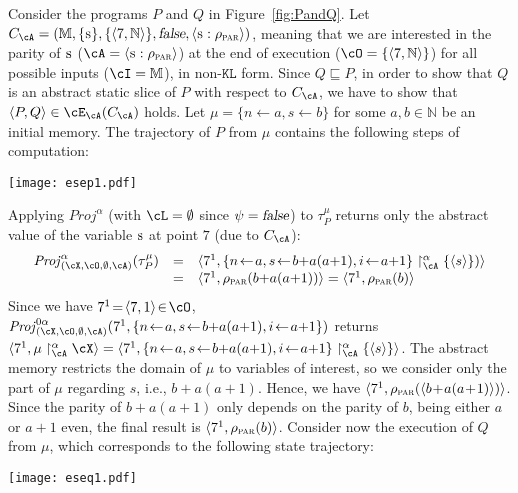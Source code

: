 \documentclass[prodmode,acmtocl]{acmsmall}
\newcommand{\caX}{\cX}
\def\prog{\ensuremath{P}\xspace}
\def\progq{\ensuremath{Q}\xspace}
\def\trace{\ensuremath{\tau}\xspace}
\def\memory{\ensuremath{\mu}\xspace}
\def\memories{\ensuremath{\mathbb{M}}\xspace}
\newcommand{\BIND}[2]{#1\!\leftarrow\!#2}
\def\crit{\ensuremath{C}\xspace}
\def\uco{\ensuremath{\rho}\xspace}
\def\KL{\ensuremath{\mathtt{KL}}\xspace}
\newcommand{\ABSMEM}[3]{#1 \upharpoonright^\alpha_{#3} #2}
\def\Proj{\ensuremath{\mathit{Proj}}\xspace}
\newcommand{\false}{\mbox{\sl false}}
\def\tuple#1{\langle #1 \rangle}
\newcommand{\0}{\mbox{\bf 0}}
\newcommand{\CODE}[1]{\ensuremath{\mbox{\lstinline!#1!}\xspace}\xspace}
\def\ss{\CODE{s}}
\def\NATURALS{\mathbb{N}}
\def\PARDOM{\ensuremath{\uco_{\textsc{par}}}\xspace}
\begin{document}
\begin{example}
  Consider the programs $\prog$ and $\progq$ in
  Figure~\ref{fig:PandQ}. Let $\crit_{\cA} = (\memories, \{\mbox{\ss}
  \},\{\tuple{7,\NATURALS}\}, \false,
  \tuple{\mbox{\ss}:\uco_{\textsc{par}}})$, meaning that we are
  interested in the parity of \ss
  ($\cA=\tuple{\mbox{\ss}:\uco_{\textsc{par}}}$) at the end of
  execution ($\cO=\{\tuple{7,\NATURALS}\}$) for all possible inputs
  ($\cI = \memories$), in non-$\KL$ form.  Since $\progq \sqsubseteq
  \prog$, in order to show that $\progq$ is an abstract static slice
  of $\prog$ with respect to $\crit_{\cA}$, we have to show that
  $\tuple{\prog,\progq} \in \cE_{\cA}(\crit_{\cA})$ holds.  Let
  $\memory = \{\BIND{n}{a}, \BIND{s}{b}\}$ for some $a,b\in\NATURALS$
  be an initial memory.  The trajectory of $\prog$ from $\memory$
  contains the following steps of computation:
\begin{center}
\texttt{[image: esep1.pdf]}
\end{center}
  Applying $\Proj^\alpha$ (with $\cL=\emptyset$ since $\psi=\false$)
  to $\trace_\prog^\memory$ returns only the abstract value of the
  variable \ss at point $7$ (due to $\crit_\cA$):
  \[
  \begin{array}{rcl}
    \Proj^\alpha_{(\caX,\cO,\emptyset,\cA)}(\trace_\prog^\memory) & =
    &
    \tuple{7^1, \ABSMEM{\{ \BIND{n}{a}, \BIND{s}{b{+}a(a{+}1)},
      \BIND{i}{a{+}1} \}}{\{\langle s \rangle\}}{\cA})} \\ & = & \tuple{7^1,
    \PARDOM(b{+}a(a{+}1))}  =  \tuple{7^1, \PARDOM(b)}
  \end{array}
  \]
  \noindent Since we have $7^1\!=\!\tuple{7, 1}\!\in\!\cO$,
  $\Proj^{0\alpha}_{(\caX,\cO,\emptyset,\cA)}(7^{1}, \{\BIND{n}{a},
  \BIND{s}{b{+}a(a{+}1)}, \BIND{i}{a{+}1} \})$ returns
  $\tuple{7^1,\ABSMEM{\memory}{\caX}{\cA}} = \tuple{7^1, \ABSMEM{\{
      \BIND{n}{a}, \BIND{s}{b{+}a(a{+}1)}, \BIND{i}{a{+}1}
      \}}{\{\langle s \rangle\}}{\cA}}$.  The abstract memory
  restricts the domain of $\memory$ to variables of interest, so we
  consider only the part of $\memory$ regarding $s$, i.e.,
  $b\!+\!a(a\!+\!1)$.  Hence, we have $\tuple{7^1, \PARDOM(\langle
    b\!+\!a(a\!+\!1)\rangle)}$.  Since the parity of $b{+}a(a{+}1)$
  only depends on the parity of $b$, being either $a$ or $a+1$ even,
  the final result is $\tuple{7^1, \PARDOM(b)}$.  Consider now the
  execution of $\progq$ from $\memory$, which corresponds to the
  following state trajectory:
  \begin{center}
\texttt{[image: eseq1.pdf]}

\end{center}
\end{example}
\end{document}
